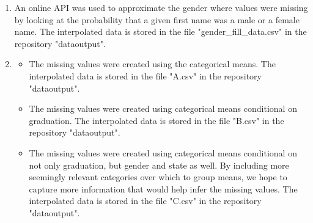\documentclass[a4paper]{article}
\begin{document}
\begin{enumerate}
\newpage

\item
An online API was used to approximate the gender where values were missing by looking at the probability that a given first name was a male or a female name. The interpolated data is stored in the file "gender\_fill\_data.csv" in the repository "dataoutput".

\item

\begin{itemize}
\item 
The missing values were created using the categorical means. The interpolated data is stored in the file "A.csv" in the repository "dataoutput".
\item
The missing values were created using categorical means conditional on graduation. The interpolated data is stored in the file "B.csv" in the repository "dataoutput".
\item
The missing values were created using categorical means conditional on not only graduation, but gender and state as well. By including more seemingly relevant categories over which to group means, we hope to capture more information that would help infer the missing values. The interpolated data is stored in the file "C.csv" in the repository "dataoutput".

\end{itemize}

\end{enumerate}
\end{document}
